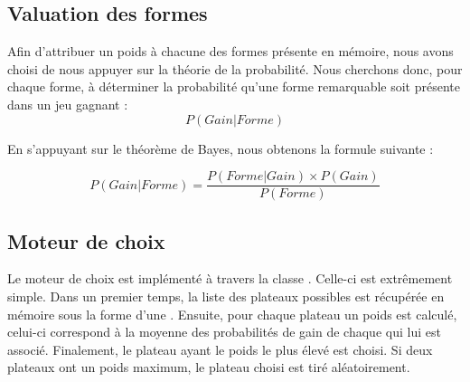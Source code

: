 \subsection{Valuation des formes}
  

Afin d'attribuer un poids à chacune des formes présente en mémoire, nous avons choisi de nous appuyer sur la théorie de la probabilité. Nous cherchons donc, pour chaque forme, à déterminer la probabilité qu'une forme remarquable soit présente dans un jeu gagnant : \[ P(Gain|Forme) \]

En s'appuyant sur le théorème de Bayes, nous obtenons la formule suivante :

\[ P(Gain|Forme) = \frac{P(Forme|Gain) \times P(Gain)}{P(Forme)} \]

\subsection{Moteur de choix}


Le moteur de choix est implémenté à travers la classe . Celle-ci est extrêmement simple. Dans un premier temps, la liste des plateaux possibles est récupérée en mémoire sous la forme d'une . Ensuite, pour chaque plateau un poids est calculé, celui-ci correspond à la moyenne des probabilités de gain de chaque  qui lui est associé. Finalement, le plateau ayant le poids le plus élevé est choisi. Si deux plateaux ont un poids maximum, le plateau choisi est tiré aléatoirement.

